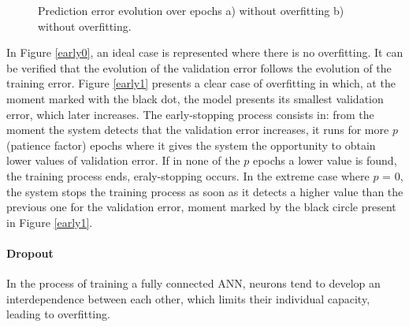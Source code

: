\begin{figure}[h!]
\captionsetup[subfigure]{position=b}
\centering
{}
\hspace{0.05\textwidth}
\caption{Prediction error evolution over epochs a) without overfitting b) without overfitting.}
\label{early}
\end{figure}

In Figure \ref{early0}, an ideal case is represented where there is no overfitting. It can be verified that the evolution of the validation error follows the evolution of the training error. Figure \ref{early1} presents a clear case of overfitting in which, at the moment marked with the black dot, the model presents its smallest validation error, which later increases. The early-stopping process consists in: from the moment the system detects that the validation error increases, it runs for more $p$ (patience factor) epochs where it gives the system the opportunity to obtain lower values of validation error. If in none of the $p$ epochs a lower value is found, the training process ends, eraly-stopping occurs. In the extreme case where $p$ = 0, the system stops the training process as soon as it detects a higher value than the previous one for the validation error, moment marked by the black circle present in Figure \ref{early1}.

\paragraph{Dropout}

In the process of training a fully connected \ac{ANN}, neurons tend to develop an interdependence between each other, which limits their individual capacity, leading to overfitting.


